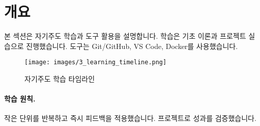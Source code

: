 \section{개요}

본 섹션은 자기주도 학습과 도구 활용을 설명합니다.
학습은 기초 이론과 프로젝트 실습으로 진행했습니다.
도구는 Git/GitHub, VS Code, Docker를 사용했습니다.

\begin{figure}[H]
    \centering
    \texttt{[image: images/3\_learning\_timeline.png]}
    \caption{자기주도 학습 타임라인}
    \label{fig:learning_timeline}
\end{figure}

\paragraph{학습 원칙.} 작은 단위를 반복하고 즉시 피드백을 적용했습니다. 프로젝트로 성과를 검증했습니다.

